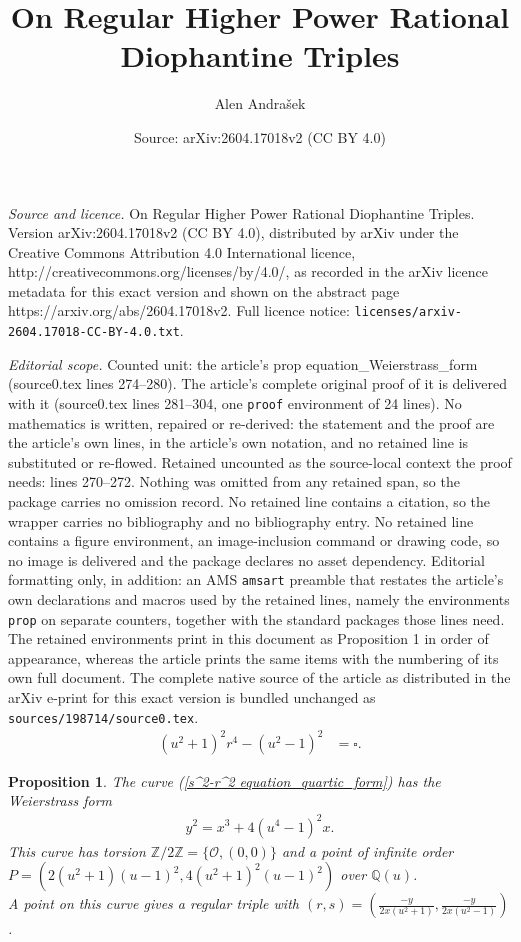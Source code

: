 \documentclass[10pt,a4paper]{amsart}
\title{On Regular Higher Power Rational Diophantine Triples}
\author{Alen Andra\v{s}ek}
\date{Source: arXiv:2604.17018v2 (CC BY 4.0)}
\newtheorem{prop}{Proposition}
\begin{document}
\maketitle

\noindent\emph{Source and licence.} On Regular Higher Power Rational Diophantine Triples. Version arXiv:2604.17018v2 (CC BY 4.0), distributed by arXiv under the Creative Commons Attribution 4.0 International licence, http://creativecommons.org/licenses/by/4.0/, as recorded in the arXiv licence metadata for this exact version and shown on the abstract page https://arxiv.org/abs/2604.17018v2. Full licence notice: \texttt{licenses/arxiv-2604.17018-CC-BY-4.0.txt}.\par\smallskip

\noindent\textit{Editorial scope.} Counted unit: the article's prop equation\_Weierstrass\_form (source0.tex lines 274--280). The article's complete original proof of it is delivered with it (source0.tex lines 281--304, one \texttt{proof} environment of 24 lines). No mathematics is written, repaired or re-derived: the statement and the proof are the article's own lines, in the article's own notation, and no retained line is substituted or re-flowed.  Retained uncounted as the source-local context the proof needs: lines 270--272.  Nothing was omitted from any retained span, so the package carries no omission record.  No retained line contains a citation, so the wrapper carries no bibliography and no bibliography entry.  No retained line contains a figure environment, an image-inclusion command or drawing code, so no image is delivered and the package declares no asset dependency.  Editorial formatting only, in addition: an AMS \texttt{amsart} preamble that restates the article's own declarations and macros used by the retained lines, namely the environments \texttt{prop} on separate counters, together with the standard packages those lines need.  The retained environments print in this document as Proposition 1 in order of appearance, whereas the article prints the same items with the numbering of its own full document.  The complete native source of the article as distributed in the arXiv e-print for this exact version is bundled unchanged as \texttt{sources/198714/source0.tex}.
\begin{align} \label{s^2-r^2 equation_quartic_form}
    (u^2+1)^2r^4 - (u^2-1)^2 &= \square.
\end{align}

\begin{prop}
    The curve (\ref{s^2-r^2 equation_quartic_form}) has the Weierstrass form \begin{align} \label{s^2-r^2 equation_Weierstrass_form}
        y^2 = x^3 + 4(u^4-1)^2x.
    \end{align}
    This curve has torsion $\mathbb{Z}/2\mathbb{Z} = \{\mathcal{O}, (0,0)\}$ and a point of infinite order $P = (2(u^2+1)(u-1)^2, 4(u^2+1)^2(u-1)^2)$ over $\mathbb{Q}(u)$.\\
    A point on this curve gives a regular triple with $(r,s)=\left(\frac{-y}{2x(u^2+1)}, \frac{-y}{2x(u^2-1)}\right)$.
\end{prop}
\end{document}
